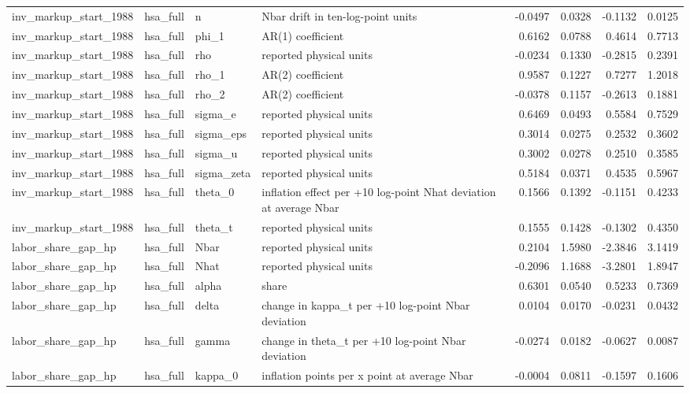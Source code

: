 \begin{tabular}{llllrrrr}
inv\_markup\_start\_1988 & hsa\_full & n & Nbar drift in ten-log-point units & -0.0497 & 0.0328 & -0.1132 & 0.0125 \\
inv\_markup\_start\_1988 & hsa\_full & phi\_1 & AR(1) coefficient & 0.6162 & 0.0788 & 0.4614 & 0.7713 \\
inv\_markup\_start\_1988 & hsa\_full & rho & reported physical units & -0.0234 & 0.1330 & -0.2815 & 0.2391 \\
inv\_markup\_start\_1988 & hsa\_full & rho\_1 & AR(2) coefficient & 0.9587 & 0.1227 & 0.7277 & 1.2018 \\
inv\_markup\_start\_1988 & hsa\_full & rho\_2 & AR(2) coefficient & -0.0378 & 0.1157 & -0.2613 & 0.1881 \\
inv\_markup\_start\_1988 & hsa\_full & sigma\_e & reported physical units & 0.6469 & 0.0493 & 0.5584 & 0.7529 \\
inv\_markup\_start\_1988 & hsa\_full & sigma\_eps & reported physical units & 0.3014 & 0.0275 & 0.2532 & 0.3602 \\
inv\_markup\_start\_1988 & hsa\_full & sigma\_u & reported physical units & 0.3002 & 0.0278 & 0.2510 & 0.3585 \\
inv\_markup\_start\_1988 & hsa\_full & sigma\_zeta & reported physical units & 0.5184 & 0.0371 & 0.4535 & 0.5967 \\
inv\_markup\_start\_1988 & hsa\_full & theta\_0 & inflation effect per +10 log-point Nhat deviation at average Nbar & 0.1566 & 0.1392 & -0.1151 & 0.4233 \\
inv\_markup\_start\_1988 & hsa\_full & theta\_t & reported physical units & 0.1555 & 0.1428 & -0.1302 & 0.4350 \\
labor\_share\_gap\_hp & hsa\_full & Nbar & reported physical units & 0.2104 & 1.5980 & -2.3846 & 3.1419 \\
labor\_share\_gap\_hp & hsa\_full & Nhat & reported physical units & -0.2096 & 1.1688 & -3.2801 & 1.8947 \\
labor\_share\_gap\_hp & hsa\_full & alpha & share & 0.6301 & 0.0540 & 0.5233 & 0.7369 \\
labor\_share\_gap\_hp & hsa\_full & delta & change in kappa\_t per +10 log-point Nbar deviation & 0.0104 & 0.0170 & -0.0231 & 0.0432 \\
labor\_share\_gap\_hp & hsa\_full & gamma & change in theta\_t per +10 log-point Nbar deviation & -0.0274 & 0.0182 & -0.0627 & 0.0087 \\
labor\_share\_gap\_hp & hsa\_full & kappa\_0 & inflation points per x point at average Nbar & -0.0004 & 0.0811 & -0.1597 & 0.1606 \\

\end{tabular}

